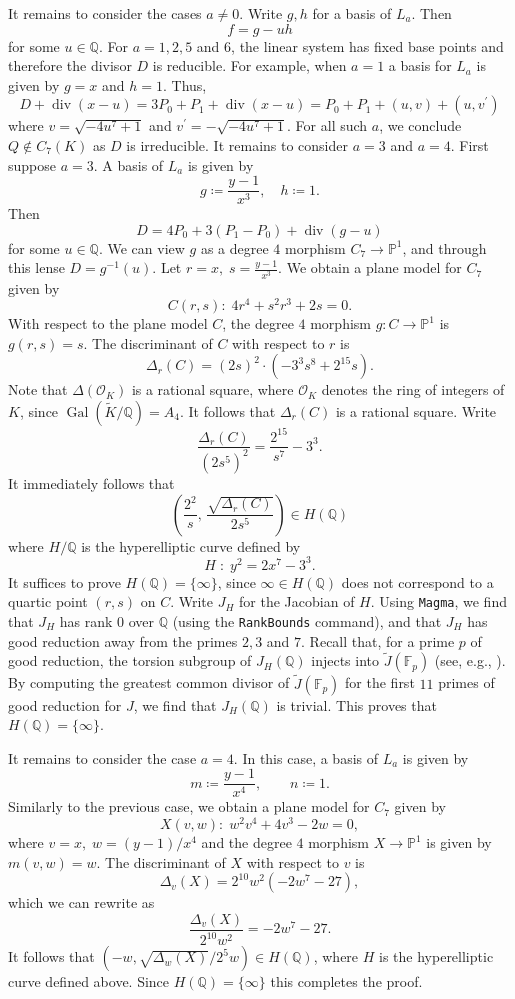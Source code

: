 \documentclass{amsart}
\theoremstyle{definition}
\newcommand{\PP}{\mathbb{P}}
\newcommand{\FF}{\mathbb{F}}
\newcommand{\Q}{\mathbb{Q}}
\DeclareMathOperator{\Gal}{Gal}
\DeclareMathOperator{\divv}{div}
\begin{document}
It remains to consider the cases $a\neq 0$. 
Write $g, h$ for a basis of $L_a$. 
Then 
\[
f = g - uh
\]
for some $u\in\Q$. 
For $a=1, 2, 5$ and $6$, the linear system has fixed base points and therefore the divisor $D$ is reducible. 
For example, when $a=1$ a basis for $L_a$ is given by $g=x$ and $h=1$. Thus,
\[
D+\divv(x-u)=3P_0+P_1+\divv(x-u)=P_0+P_1+(u,v)+(u,v^\prime)
\]
where $v=\sqrt{-4u^7+1}$ and $v^\prime=-\sqrt{-4u^7+1}$.
For all such $a$, we conclude $Q\not\in C_7(K)$ as $D$ is irreducible.  
It remains to consider $a=3$ and $a=4$. 
First suppose $a =3$.
A basis of $L_a$ is given by 
\[
g\coloneqq\frac{y-1}{x^3},\quad  h\coloneqq1.
\]
Then
\[
D = 4P_0 + 3(P_1-P_0) + \divv(g-u)
\]
for some $u\in\Q$. 
We can view $g$ as a degree $4$ morphism $C_7\rightarrow \PP^1$, and through this lense $D=g^{-1}(u)$.
Let $r=x,\; s=\frac{y-1}{x^3}$. 
We obtain a plane model for $C_7$ given by 
\[
C(r,s):\;4r^4+s^2r^3+2s=0.
\]
With respect to the plane model $C$, the degree $4$ morphism $g: C\rightarrow \PP^1$ is $g(r,s)=s$.
The discriminant of $C$ with respect to $r$ is
\[
\Delta_{r}(C)=(2s)^2\cdot (-3^3s^8+2^{15}s).
\]
Note that $\Delta(\mathcal{O}_{K})$ is a rational square, where $\mathcal{O}_{K}$ denotes the ring of integers of $K$, since $\Gal(\tilde{K}/\Q)=A_{4}$. 
It follows that $\Delta_{r}(C)$ is a rational square.
Write
\[
\frac{\Delta_r(C)}{(2s^5)^2}=\frac{2^{15}}{s^7}-3^3.
\]
It immediately follows that
\[
\left(\frac{2^2}{s},\, \frac{\sqrt{\Delta_r(C)}}{2s^5}\right)\in H(\Q)
\]
where $H/\Q$ is the hyperelliptic curve defined by
\[
H \; :\; y^2=2 x^7-3^3.
\]
It suffices to prove $H(\Q)=\{\infty\}$, since $\infty\in H(\Q)$ does not correspond to a quartic point $(r,s)$ on $C$. Write $J_{H}$ for the Jacobian of $H$. 
Using \texttt{Magma}, we find that $J_{H}$ has rank $0$ over $\Q$ (using the \texttt{RankBounds} command), and that $J_{H}$ has good reduction away from the primes $2, 3$ and $7$. Recall that, for a prime $p$ of good reduction, the torsion subgroup of $J_H(\Q)$ injects into $\tilde{J}(\FF_p)$ (see, e.g., \cite[Appendix]{Katz}). 
By computing the greatest common divisor of $\tilde{J}(\FF_p)$ for the first $11$ primes of good reduction for $J$, we find that $J_{H}(\Q)$ is trivial. This proves that $H(\Q)=\{\infty\}$.  

It remains to consider the case $a=4$. In this case, a basis of $L_a$ is given by 
\[
    m\coloneqq \frac{y-1}{x^4},\qquad n\coloneqq 1.
\]
Similarly to the previous case, we obtain a plane model for $C_7$ given by 
\[
X(v,w):\; w^2v^4+4v^3-2w = 0,
\]
where $v=x, \; w = (y-1)/x^4$ and the degree $4$ morphism $X\rightarrow \PP^1$ is given by $m(v,w)=w$.
The discriminant of $X$ with respect to $v$ is 
\[
\Delta_v(X)=2^{10}w^{2}(-2w^7-27),
\]
which we can rewrite as 
\[
\frac{\Delta_v(X)}{2^{10}w^2} = -2w^7-27.
\]
It follows that $(-w, \sqrt{\Delta_w(X)}/2^{5}w)\in H(\Q)$, where $H$ is the hyperelliptic curve defined above.
Since $H(\Q)=\{\infty\}$ this completes the proof. 
\end{document}

